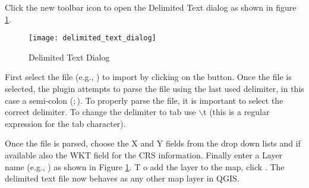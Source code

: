 Click the new toolbar icon  
to open the Delimited Text dialog as shown in figure 
\ref{fig:delim_text_plugin_dialog}.

\begin{figure}[ht]
   \centering
   \texttt{[image: delimited\_text\_dialog]}   
   \caption{Delimited Text Dialog \nixcaption}\label{fig:delim_text_plugin_dialog}
\end{figure}

First select the file (e.g., ) to 
import by clicking on the  button. Once the file is selected, 
the plugin attempts to parse the file using the last used delimiter, in this 
case a semi-colon (\mbox{$;$}). To properly parse the file, it 
is important to select the correct delimiter. To change the delimiter to tab use 
\mbox{$\backslash$}t (this is a regular expression for the tab character).

Once the file is parsed, choose the X and Y fields from the drop down lists and 
if available also the WKT field for the CRS information. Finally enter a Layer 
name (e.g.,  ) as shown in Figure \ref{fig:delim_text_plugin_dialog}. T
o add the layer to the map, click . The delimited text file now 
behaves as any other map layer in QGIS.

\FloatBarrier
